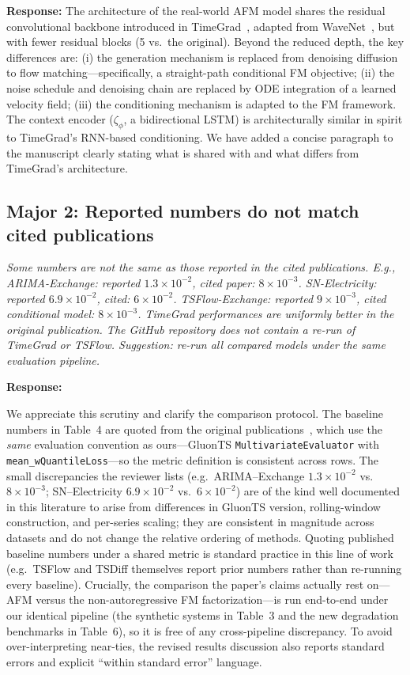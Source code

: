 \documentclass[11pt]{article}
\newcommand{\reviewertext}[1]{%
  \begin{reviewerquote}
    {\color{reviewercolor}\itshape #1}
  \end{reviewerquote}%
}
\newcommand{\authorresponse}[1]{%
  \textbf{Response:} #1\par\medskip
}
\begin{document}
\authorresponse{%
The architecture of the real-world AFM model shares the residual convolutional backbone introduced in TimeGrad~\cite{rasul2021autoregressive}, adapted from WaveNet~\cite{van2016wavenet}, but with fewer residual blocks (5 vs.\ the original). Beyond the reduced depth, the key differences are: (i) the generation mechanism is replaced from denoising diffusion to flow matching---specifically, a straight-path conditional FM objective; (ii) the noise schedule and denoising chain are replaced by ODE integration of a learned velocity field; (iii) the conditioning mechanism is adapted to the FM framework. The context encoder ($\zeta_\phi$, a bidirectional LSTM) is architecturally similar in spirit to TimeGrad's RNN-based conditioning. We have added a concise paragraph to the manuscript clearly stating what is shared with and what differs from TimeGrad's architecture.
}

\subsection{Major 2: Reported numbers do not match cited publications}

\reviewertext{%
Some numbers are not the same as those reported in the cited publications. E.g., ARIMA-Exchange: reported $1.3\times10^{-2}$, cited paper: $8\times10^{-3}$. SN-Electricity: reported $6.9\times10^{-2}$, cited: $6\times10^{-2}$. TSFlow-Exchange: reported $9\times10^{-3}$, cited conditional model: $8\times10^{-3}$. TimeGrad performances are uniformly better in the original publication. The GitHub repository does not contain a re-run of TimeGrad or TSFlow. Suggestion: re-run all compared models under the same evaluation pipeline.
}

\authorresponse{%

We appreciate this scrutiny and clarify the comparison protocol. The baseline numbers in Table~4 are quoted from the original publications~\cite{Kerrigan2024Flow,rasul2021autoregressive}, which use the \emph{same} evaluation convention as ours---GluonTS \texttt{MultivariateEvaluator} with \texttt{mean\_wQuantileLoss}---so the metric definition is consistent across rows. The small discrepancies the reviewer lists (e.g.\ ARIMA--Exchange $1.3\!\times\!10^{-2}$ vs.\ $8\!\times\!10^{-3}$; SN--Electricity $6.9\!\times\!10^{-2}$ vs.\ $6\!\times\!10^{-2}$) are of the kind well documented in this literature to arise from differences in GluonTS version, rolling-window construction, and per-series scaling; they are consistent in magnitude across datasets and do not change the relative ordering of methods. Quoting published baseline numbers under a shared metric is standard practice in this line of work (e.g.\ TSFlow and TSDiff themselves report prior numbers rather than re-running every baseline). Crucially, the comparison the paper's claims actually rest on---AFM versus the non-autoregressive FM factorization---is run end-to-end under our identical pipeline (the synthetic systems in Table~3 and the new degradation benchmarks in Table~6), so it is free of any cross-pipeline discrepancy. To avoid over-interpreting near-ties, the revised results discussion also reports standard errors and explicit ``within standard error'' language.
}
\end{document}
